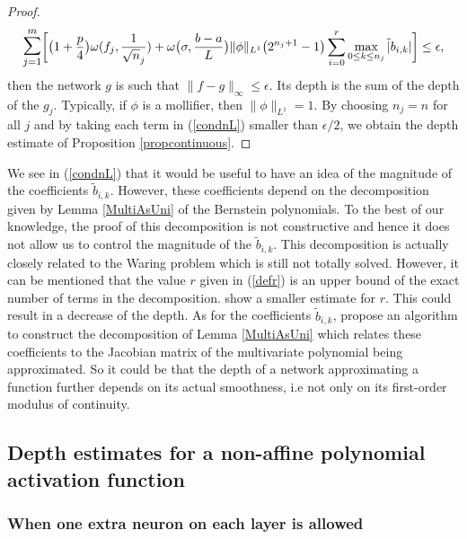 \documentclass[anon,12pt]{colt2021} %
\begin{document}
\begin{proof}
\begin{equation} \label{condnL}
     \mathlarger{\mathlarger{\sum}}_{j=1}^{m} \bigg[ \big( 1 + \frac{p}{4} \big) \omega(f_{j}, \frac{1}{\sqrt{n}_{j}})+ \omega \big( \sigma, \frac{b-a}{L}\big) \| \phi \|_{L^{1}} \big( 2^{n_{j}+1}-1 \big) \sum_{i=0}^{r} \max_{0 \leq k \leq n_{j}} \tilde \vert b_{i,k} \vert \bigg] \leq \epsilon,
\end{equation}
then the network $g$ is such that $\| f - g \|_{\infty} \leq \epsilon$. Its depth is the sum of the depth of the $g_{j}$. Typically, if $\phi$ is a mollifier, then $\| \phi \|_{L^{1}}=1$. By choosing $n_{j}=n$ for all $j$ and by taking each term in (\ref{condnL}) smaller than $\epsilon/2$, we obtain the depth estimate of Proposition \ref{propcontinuous}.
\end{proof}

\begin{remark}
We see in (\ref{condnL}) that it would be useful to have an idea of the magnitude of the coefficients $\tilde b_{i,k}$. However, these coefficients depend on the decomposition given by Lemma \ref{MultiAsUni} of the Bernstein polynomials. To the best of our knowledge, the proof of this decomposition is not constructive and hence it does not allow us to control the magnitude of the $\tilde b_{i,k}$. This decomposition is actually closely related to the Waring problem which is still not totally solved. However, it can be mentioned that the value $r$ given in (\ref{defr}) is an upper bound of the exact number of terms in the decomposition. \cite{Alexander} show a smaller estimate for $r$. This could result in a decrease of the depth. As for the coefficients $\tilde b_{i,k}$, \cite{Dreesen} propose an algorithm to construct the decomposition of Lemma \ref{MultiAsUni} which relates these coefficients to the Jacobian matrix of the multivariate polynomial being approximated. So it could be that the depth of a network approximating a function further depends on its actual smoothness, i.e not only on its first-order modulus of continuity.
\end{remark}

\subsection{Depth estimates for a non-affine polynomial activation function}

\subsubsection{When one extra neuron on each layer is allowed}
\end{document}
